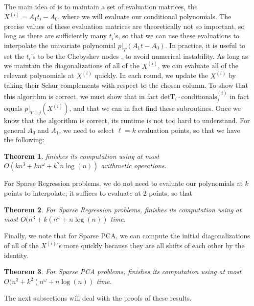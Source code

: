 \documentclass{amsart}
\newtheorem{theorem}{Theorem}[section]
\theoremstyle{definition}
\begin{document}
The main idea of  is to maintain a set of evaluation matrices, the $X^{(i)} = A_1t_i - A_0$, where we will evaluate our conditional polynomials.
The precise values of these evaluation matrices are theoretically not so important, so long as there are sufficiently many $t_i$'s, so that we can use these evaluations to interpolate the univariate polynomial $p|_T(A_1t-A_0)$.
In practice, it is useful to set the $t_i$'s to be the Chebyshev nodes \cite{TODO}, to avoid numerical instability.
As long as we maintain the diagonalizations of all of the $X^{(i)}$, we can evaluate all of the relevant polynomials at $X^{(i)}$ quickly.
In each round, we update the $X^{(i)}$ by taking their Schur complements with respect to the chosen column.
To show that this algorithm is correct, we must show that in fact $\text{detT}_i\cdot\text{conditionals}^{(i)}_j$ in fact equals $p|_{T+j}(X^{(i)})$, and that we can in fact find these subroutines.
Once we know that the algorithm is correct, its runtime is not too hard to understand. For general  $A_0$ and $A_1$, we need to select $\ell = k$ evaluation points, so that we have the following:
\begin{theorem}
    \label{thm:alg_runtime_general}
     finishes its computation using at most $O(kn^3 + kn^{\omega}+k^2n\log(n))$ arithmetic operations.
\end{theorem}
For Sparse Regression problems, we do not need to evaluate our polynomials at $k$ points to interpolate; it suffices to evaluate at 2 points, so that
\begin{theorem}
    \label{thm:alg_runtime_reg}
    For Sparse Regression problems,  finishes its computation using at most $O(n^3 + k(n^{\omega}+n\log(n))$ time.
\end{theorem}
Finally, we note that for Sparse PCA, we can compute the initial diagonalizations of all of the $X^{(i)}$'s more quickly because they are all shifts of each other by the identity.
\begin{theorem}
    \label{thm:alg_runtime_pca}
    For Sparse PCA problems,  finishes its computation using at most $O(n^3 + k^2(n^{\omega}+n\log(n))$ time.
\end{theorem}

The next subsections will deal with the proofs of these results.
\end{document}
